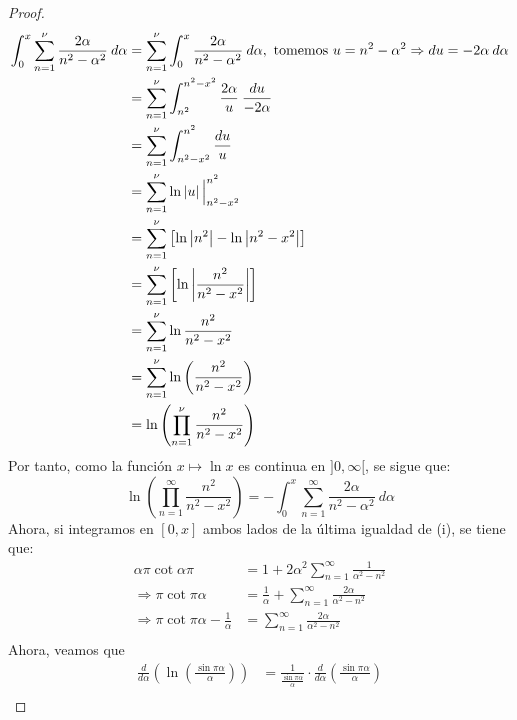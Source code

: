 \documentclass[12pt]{report}
\theoremstyle{largebreak}
\newcommand\abs[1]{\ensuremath{\left|#1\right|}}
\begin{document}
\begin{proof}
\begin{equation*}
\begin{split}
                \int_{0}^x \sum_{n=1}^\nu\frac{2\alpha}{n^2-\alpha^2}\:d\alpha&=\sum_{n=1}^\nu\int_{0}^x\frac{2\alpha}{n^2-\alpha^2}\:d\alpha,\textup{ tomemos }u=n^2-\alpha^2\Rightarrow du=-2\alpha\:d\alpha \\
                &=\sum_{n=1}^\nu\int_{n^2}^{n^2-x^2}\frac{2\alpha}{u}\: \frac{du}{-2\alpha}\\
                &=\sum_{n=1}^\nu\int_{n^2-x^2}^{n^2}\frac{du}{u}\\
                &=\sum_{n=1}^\nu\ln\abs{u}\Big|_{n^2-x^2}^{n^2}\\
                &=\sum_{n=1}^\nu\left[\ln\abs{n^2}-\ln\abs{n^2-x^2}\right]\\
                &=\sum_{n=1}^\nu\left[\ln\abs{\frac{n^2}{n^2-x^2}}\right]\\
                &=\sum_{n=1}^\nu\ln\frac{n^2}{n^2-x^2}\\
                &=\sum_{n=1}^\nu\ln\left(\frac{n^2}{n^2-x^2}\right)\\
                &=\ln\left(\prod_{ n=1}^\nu\frac{n^2}{n^2-x^2}\right)\\
            \end{split}
        \end{equation*}
        Por tanto, como la función $x\mapsto\ln x$ es continua en $]0,\infty[$, se sigue que:
        \begin{equation*}
            \ln\left(\prod_{ n=1}^\infty\frac{n^2}{n^2-x^2}\right)=-\int_0^x\sum_{ n=1}^\infty\frac{2\alpha}{n^2-\alpha^2}\:d\alpha
        \end{equation*}
        Ahora, si integramos en $[0,x]$ ambos lados de la última igualdad de (i), se tiene que:
        \begin{equation*}
            \begin{split}
                \alpha\pi\cot\alpha\pi&=1+2\alpha^2\sum_{n=1}^{\infty}\frac{1}{\alpha^2-n^2}\\
                \Rightarrow \pi\cot\pi\alpha&=\frac{1}{\alpha}+\sum_{n=1}^{\infty}\frac{2\alpha}{\alpha^2-n^2}\\
                \Rightarrow \pi\cot\pi\alpha-\frac{1}{\alpha}&=\sum_{n=1}^{\infty}\frac{2\alpha}{\alpha^2-n^2}\\
            \end{split}
        \end{equation*}
        Ahora, veamos que
        \begin{equation*}
            \begin{split}
                \frac{d}{d\alpha}\left(\ln\left(\frac{\sin \pi\alpha}{\alpha}\right)\right)&=\frac{1}{\frac{\sin \pi\alpha}{\alpha}}\cdot\frac{d}{d\alpha}\left(\frac{\sin \pi\alpha}{\alpha}\right)\\

\end{split}
\end{equation*}
\end{proof}
\end{document}
